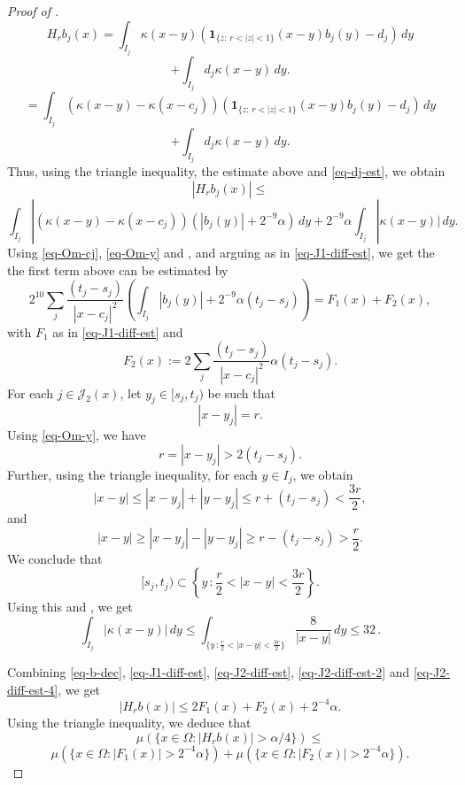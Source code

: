 \begin{proof}[Proof of ]
$$
H_r b_j(x)=\int_{I_j} \kappa(x-y) (\mathbf{1}_{\{z:\, r<|z|<1\}}(x-y)b_j(y)-d_j)\, dy$$
$$+ \int_{I_j} d_j \kappa(x-y) \, dy.
$$
$$=\int_{I_j} (\kappa(x-y)-\kappa(x-c_j)) (\mathbf{1}_{\{z:\, r<|z|<1\}}(x-y)b_j(y)-d_j)\, dy$$
$$+ \int_{I_j} d_j \kappa(x-y) \, dy.$$
Thus, using the triangle inequality, the estimate above and \eqref{eq-dj-est}, we obtain
$$|H_r b_j(x)|\leq $$
\begin{equation}
    \label{eq-J2-diff-est}
    \int_{I_j} |(\kappa(x-y)-\kappa(x-c_j)) \left(|b_j(y)|+2^{-9}\alpha\right)\, dy +2^{-9}\alpha \int_{I_j} |\kappa(x-y)| \, dy.
\end{equation}
Using \eqref{eq-Om-cj}, \eqref{eq-Om-y} and , and arguing as in \eqref{eq-J1-diff-est}, we get the the first term above can be estimated by
\begin{equation}
    \label{eq-J2-diff-est-2}
    2^{10}\sum_{j} \frac{(t_j-s_j)}{|x-c_j|^2}\left(\int_{I_j} |b_j(y)|+2^{-9} \alpha (t_j-s_j)\right)=F_1(x)+F_2(x),
\end{equation}
with $F_1$ as in \eqref{eq-J1-diff-est} and
\begin{equation}
    \label{eq-def-F2}
    F_2(x):= 2\sum_{j} \frac{(t_j-s_j)}{|x-c_j|^2} \alpha (t_j-s_j).
\end{equation}
For each $j\in \mathcal{J}_2(x)$, let $y_j\in [s_j, t_j)$ be such that
$$|x-y_j|=r.$$ Using \eqref{eq-Om-y}, we have
$$r=|x-y_j|>2(t_j-s_j).$$
Further, using the triangle inequality, for each $y\in I_j$, we obtain
$$|x-y|\leq |x-y_j|+|y-y_j|\leq r+(t_j-s_j)<\frac{3r}{2},$$
and
$$|x-y|\geq |x-y_j|-|y-y_j|\geq r-(t_j-s_j)>\frac{r}{2}.$$
We conclude that
$$[s_j, t_j)\subset \left\{y\,: \frac{r}{2}<|x-y|<\frac{3r}{2}\right\}.$$
Using this and , we get
\begin{equation}
    \label{eq-J2-diff-est-4}
    \int_{I_j}|\kappa(x-y)|\,dy \leq \int_{\{y\,: \frac{r}{2}<|x-y|<\frac{3r}{2}\}}\frac{8}{|x-y|}\, dy\leq 32\,.
\end{equation}

Combining \eqref{eq-b-dec}, \eqref{eq-J1-diff-est}, \eqref{eq-J2-diff-est}, \eqref{eq-J2-diff-est-2} and \eqref{eq-J2-diff-est-4}, we get
\begin{equation*}
    |H_rb(x)|\leq 2F_1(x)+F_2(x)+2^{-4}\alpha.
\end{equation*}
Using the triangle inequality, we deduce that
$$\mu({\{x\in \Omega: |H_r b(x)|>\alpha/4\}})\leq $$
\begin{equation}
    \label{eq-set-dec-3}
    \mu(\{x\in \Omega: |F_1(x)|> 2^{-4} \alpha\})+\mu(\{x\in \Omega: | F_2(x)|> 2^{-4}\alpha\}).
\end{equation}


\end{proof}
